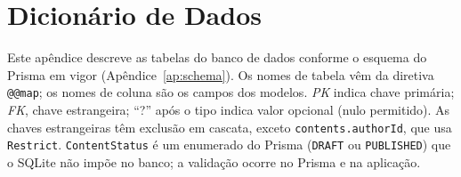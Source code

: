 \chapter{Dicionário de Dados}\label{ap:dicionario}

Este apêndice descreve as tabelas do banco de dados conforme o esquema do Prisma em vigor (Apêndice~\ref{ap:schema}). Os nomes de tabela vêm da diretiva \texttt{@@map}; os nomes de coluna são os campos dos modelos. \emph{PK} indica chave primária; \emph{FK}, chave estrangeira; ``?'' após o tipo indica valor opcional (nulo permitido). As chaves estrangeiras têm exclusão em cascata, exceto \texttt{contents.authorId}, que usa \texttt{Restrict}. \texttt{ContentStatus} é um enumerado do Prisma (\texttt{DRAFT} ou \texttt{PUBLISHED}) que o SQLite não impõe no banco; a validação ocorre no Prisma e na aplicação.

